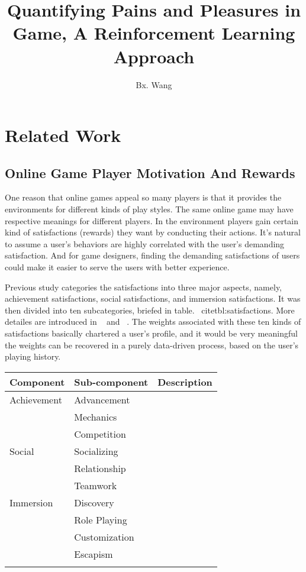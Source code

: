 \documentclass[a4paper]{article}
\title{Quantifying Pains and Pleasures in Game, A Reinforcement Learning Approach}
\author{Bx. Wang}
\begin{document}
\maketitle

\section{Related Work}

\subsection{Online Game Player Motivation And Rewards}

One reason that online games appeal so many players is that it provides the environments for different kinds of play styles. The same online game may have respective meanings for different players. In the environment players gain certain kind of satisfactions (rewards) they want by conducting their actions. It's natural to assume a user's behaviors are highly correlated with the user's demanding satisfaction. And for game designers, finding the demanding satisfactions of users could make it easier to serve the users with better experience. 

Previous study categories the satisfactions into three major aspects, namely, achievement satisfactions, social satisfactions, and immersion satisfactions. It was then divided into ten subcategories, briefed in table. ~cite{tbl:satisfactions}. More detailes are introduced in ~\cite{} and ~\cite{}. The weights associated with these ten kinds of satisfactions basically chartered a user's profile, and it would be very meaningful the weights can be recovered in a purely data-driven process, based on the user's playing history.


\begin{tabular}{l|l|p{9cm}}
    \toprule
    Component  &Sub-component & Description \\
    \midrule
    Achievement & Advancement &  \\
     & Mechanics &  \\
     & Competition &  \\
    Social & Socializing &  \\
     & Relationship &  \\
     & Teamwork &  \\
    Immersion & Discovery &  \\
     & Role Playing &  \\
     & Customization &  \\
     & Escapism &  \\
    \bottomrule
    \label{tbe:satisfactions}
\end{tabular}
\end{document}
